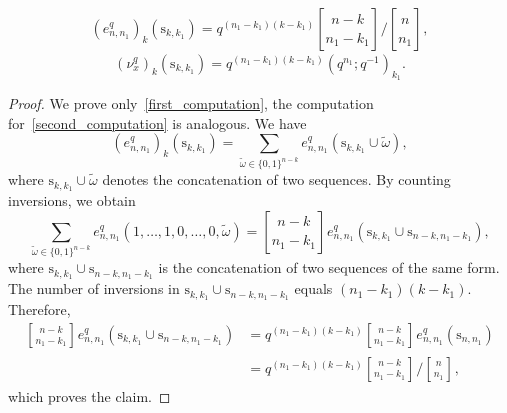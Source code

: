 \documentclass[10pt,a4paper]{amsart}
\newcommand{\qbinom}[3]{\genfrac{[}{]}{0pt}{}{#1}{#2}_{#3}}
\begin{document}
\begin{prop}\label{computation_prop}
\begin{equation}\label{first_computation}
(e^{q}_{n, n_1})_{k} \left(\text{s}_{k,k_{1}}\right) = q^{(n_{1} - k_{1})(k-k_{1})}\qbinom{n-k}{n_{1}-k_{1}}{} \bigg/ \qbinom{n}{n_{1}}{},
\end{equation}
\begin{equation}\label{second_computation}
(\nu^{q}_{x})_{k}  \left(\text{s}_{k,k_{1}}\right) = q^{(n_{1} - k_{1})(k-k_{1})}(q^{n_{1}}; q^{-1})_{k_{1}}.
\end{equation}
\end{prop}

\begin{proof}

We prove only~\eqref{first_computation}, the computation for~\eqref{second_computation} is analogous.
We have
\begin{equation*}
(e^{q}_{n, n_1})_{k} \left(\text{s}_{k,k_{1}}\right) = \sum_{\tilde{\omega} \in \{0,1\}^{n-k}} e^{q}_{n, n_1} \left(\text{s}_{k,k_{1}} \cup \tilde{\omega} \right),
\end{equation*}
where \( \text{s}_{k,k_{1}} \cup \tilde{\omega} \) denotes the concatenation of two sequences.
By counting inversions, we obtain
\begin{equation*}
\sum_{\tilde{\omega} \in \{0,1\}^{n-k}} e^{q}_{n, n_1} (1,\ldots,1,0,\ldots,0, \tilde{\omega}) 
=  \qbinom{n-k}{n_{1}-k_{1}}{}  e^{q}_{n, n_1} \left(\text{s}_{k, k_{1}} \cup \text{s}_{n-k, n_{1}-k_{1}}\right),
\end{equation*}
where \( \text{s}_{k,k_{1}} \cup \text{s}_{n-k,n_{1}-k_{1}} \) is the concatenation of two sequences of the same form.
The number of inversions in \( \text{s}_{k,k_{1}} \cup \text{s}_{n-k,n_{1}-k_{1}} \) equals \( (n_{1} - k_{1})(k - k_{1}) \). Therefore,
\begin{align*}
\qbinom{n-k}{n_{1}-k_{1}}{}  e^{q}_{n, n_1} \left(\text{s}_{k, k_{1}} \cup \text{s}_{n-k, n_{1}-k_{1}}\right)
&= q^{(n_{1}-k_{1})(k-k_{1})} \qbinom{n-k}{n_{1}-k_{1}}{} e^{q}_{n, n_1} \left(\text{s}_{n,n_{1}}\right) \\
&= q^{(n_{1}-k_{1})(k-k_{1})} \qbinom{n-k}{n_{1}-k_{1}}{} \bigg/ \qbinom{n}{n_{1}}{},
\end{align*}
which proves the claim.
\end{proof}
\end{document}
